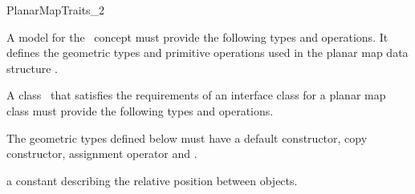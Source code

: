 
\ccRefPageBegin


\begin{ccRefConcept}{PlanarMapTraits_2}
\label{PM_sec:req:interface} 
 
   
   A model for the \ccRefName\ concept must provide the following types and
   operations. It defines the geometric types and primitive operations used
   in the planar map data structure .



\ccDefinition
    A class \ccClassTemplateName\ that satisfies the requirements of an
    interface class for a planar map class must provide the following types
    and operations. 

\ccTypes

    The geometric types defined below must have a default constructor,
    copy constructor, assignment operator and .
    
    

    


    {a constant describing the relative position between objects.}
    
\ccCreation
    

\end{ccRefConcept}
